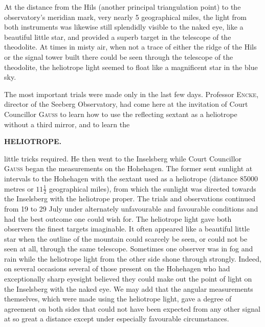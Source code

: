 \par\noindent\hspace*{\parindent}At the distance from the Hils (another principal triangulation point) to the observatory's meridian mark, very nearly 5 geographical miles, the light from both instruments was likewise still splendidly visible to the naked eye, like a beautiful little star, and provided a superb target in the telescope of the theodolite. At times in misty air, when not a trace of either the ridge of the Hils or the signal tower built there could be seen through the telescope of the theodolite, the heliotrope light seemed to float like a magnificent star in the blue sky.

\par\noindent\hspace*{\parindent}The most important trials were made only in the last few days. Professor \textsc{Encke}, director of the Seeberg Observatory, had come here at the invitation of Court Councillor \textsc{Gauss} to learn how to use the reflecting sextant as a heliotrope without a third mirror, and to learn the

\par\clearpage
\noindent\null\hfill{\small\textbf{HELIOTROPE.}}\hfill{}\par\medskip
\noindent little tricks required. He then went to the Inselsberg while Court Councillor \textsc{Gauss} began the measurements on the Hohehagen. The former sent sunlight at intervals to the Hohehagen with the sextant used as a heliotrope (distance 85000 metres or $11\frac12$ geographical miles), from which the sunlight was directed towards the Inselsberg with the heliotrope proper. The trials and observations continued from 19 to 29 July under alternately unfavourable and favourable conditions and had the best outcome one could wish for. The heliotrope light gave both observers the finest targets imaginable. It often appeared like a beautiful little star when the outline of the mountain could scarcely be seen, or could not be seen at all, through the same telescope. Sometimes one observer was in fog and rain while the heliotrope light from the other side shone through strongly. Indeed, on several occasions several of those present on the Hohehagen who had exceptionally sharp eyesight believed they could make out the point of light on the Inselsberg with the naked eye. We may add that the angular measurements themselves, which were made using the heliotrope light, gave a degree of agreement on both sides that could not have been expected from any other signal at so great a distance except under especially favourable circumstances.


